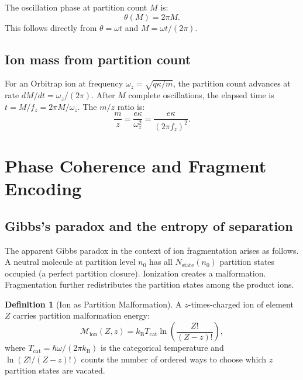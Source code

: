 \documentclass[twocolumn,10pt,a4paper]{article}
\theoremstyle{thmstyle}
\theoremstyle{definition}
\newtheorem{definition}[theorem]{Definition}
\theoremstyle{remark}
\newcommand{\kB}{k_{\mathrm{B}}}
\newcommand{\Mop}{\mathcal{M}}
\newcommand{\Tcat}{T_{\mathrm{cat}}}
\begin{document}
The oscillation phase at partition count $M$ is:
\begin{equation}
\theta(M) = 2\pi M.
\label{eq:phase}
\end{equation}
This follows directly from $\theta = \omega t$ and $M = \omega t/(2\pi)$.

\subsection{Ion mass from partition count}

For an Orbitrap ion at frequency $\omega_z = \sqrt{q\kappa/m}$, the
partition count advances at rate $dM/dt = \omega_z/(2\pi)$. After $M$
complete oscillations, the elapsed time is $t = M/f_z = 2\pi M/\omega_z$.
The $m/z$ ratio is:
\begin{equation}
\frac{m}{z} = \frac{e\kappa}{\omega_z^2} = \frac{e\kappa}{(2\pi f_z)^2}.
\label{eq:mz-from-freq}
\end{equation}

\section{Phase Coherence and Fragment Encoding}
\label{sec:phase}

\subsection{Gibbs's paradox and the entropy of separation}

The apparent Gibbs paradox in the context of ion fragmentation arises
as follows. A neutral molecule at partition level $n_0$ has all
$N_{\text{state}}(n_0)$ partition states occupied (a perfect partition
closure). Ionization creates a malformation. Fragmentation further
redistributes the partition states among the product ions.

\begin{definition}[Ion as Partition Malformation]
\label{def:malformation}
A $z$-times-charged ion of element $Z$ carries partition malformation
energy:
\begin{equation}
\Mop_{\mathrm{ion}}(Z,z) = \kB\Tcat\ln\!\left(\frac{Z!}{(Z-z)!}\right),
\label{eq:malformation}
\end{equation}
where $\Tcat = \hbar\omega/(2\pi\kB)$ is the categorical temperature and
$\ln(Z!/(Z-z)!)$ counts the number of ordered ways to choose which $z$
partition states are vacated.
\end{definition}
\end{document}
